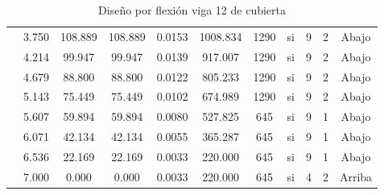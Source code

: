 \begin{table}[H]
{\begin{tabular}{|c|c|c|c|c|c|c|c|c|c|c|}
\cline{2-11}          & 3.750 & 108.889 & 108.889 & 0.0153 & 1008.834 & 1290  & si    & 9     & 2     & Abajo \bigstrut\\
\cline{2-11}          & 4.214 & 99.947 & 99.947 & 0.0139 & 917.007 & 1290  & si    & 9     & 2     & Abajo \bigstrut\\
\cline{2-11}          & 4.679 & 88.800 & 88.800 & 0.0122 & 805.233 & 1290  & si    & 9     & 2     & Abajo \bigstrut\\
\cline{2-11}          & 5.143 & 75.449 & 75.449 & 0.0102 & 674.989 & 1290  & si    & 9     & 2     & Abajo \bigstrut\\
\cline{2-11}          & 5.607 & 59.894 & 59.894 & 0.0080 & 527.825 & 645   & si    & 9     & 1     & Abajo \bigstrut\\
\cline{2-11}          & 6.071 & 42.134 & 42.134 & 0.0055 & 365.287 & 645   & si    & 9     & 1     & Abajo \bigstrut\\
\cline{2-11}          & 6.536 & 22.169 & 22.169 & 0.0033 & 220.000 & 645   & si    & 9     & 1     & Abajo \bigstrut\\
\cline{2-11}          & 7.000 & 0.000 & 0.000 & 0.0033 & 220.000 & 645   & si    & 4     & 2     & Arriba \bigstrut\\
    \hline
    \end{tabular}}%
  \caption{Diseño por flexión viga 12 de cubierta}
  \label{tab:F V12C}%
\end{table}%
